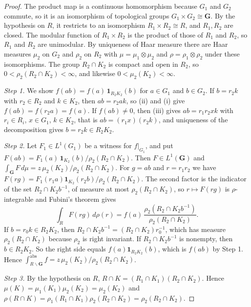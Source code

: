 \begin{proof}
The product map is a continuous homomorphism because $G_1$ and $G_2$ commute, so it is an isomorphism of topological groups $G_1\times G_2\cong\mathbf G$. By the hypothesis on $R$, it restricts to an isomorphism $R_1\times R_2\cong R$, and $R_1,R_2$ are closed. The modular function of $R_1\times R_2$ is the product of those of $R_1$ and $R_2$, so $R_1$ and $R_2$ are unimodular. By uniqueness of Haar measure there are Haar measures $\mu_2$ on $G_2$ and $\rho_2$ on $R_2$ with $\mu=\mu_1\otimes\mu_2$ and $\rho=\rho_1\otimes\rho_2$ under these isomorphisms. The group $R_2\cap K_2$ is compact and open in $R_2$, so $0<\rho_2(R_2\cap K_2)<\infty$, and likewise $0<\mu_2(K_2)<\infty$.

\emph{Step 1.} We show $f(ab)=f(a)\,\mathbf 1_{R_2K_2}(b)$ for $a\in G_1$ and $b\in G_2$. If $b=r_2k$ with $r_2\in R_2$ and $k\in K_2$, then $ab=r_2ak$, so (ii) and (i) give $f(ab)=f(r_2a)=f(a)$. If $f(ab)\ne0$, then (iii) gives $ab=r_1r_2xk$ with $r_i\in R_i$, $x\in G_1$, $k\in K_2$, that is $ab=(r_1x)(r_2k)$, and uniqueness of the decomposition gives $b=r_2k\in R_2K_2$.

\emph{Step 2.} Let $F_1\in L^1(G_1)$ be a witness for $f|_{G_1}$, and put $F(ab)=F_1(a)\,\mathbf 1_{K_2}(b)/\rho_2(R_2\cap K_2)$. Then $F\in L^1(\mathbf G)$ and $\int_{\mathbf G}F\,d\mu=z\,\mu_2(K_2)/\rho_2(R_2\cap K_2)$. For $g=ab$ and $r=r_1r_2$ we have $F(rg)=F_1(r_1a)\mathbf 1_{K_2}(r_2b)/\rho_2(R_2\cap K_2)$. The second factor is the indicator of the set $R_2\cap K_2b^{-1}$, of measure at most $\rho_2(R_2\cap K_2)$, so $r\mapsto F(rg)$ is $\rho$-integrable and Fubini's theorem gives
\[
\int_RF(rg)\,d\rho(r)=f(a)\,\frac{\rho_2(R_2\cap K_2b^{-1})}{\rho_2(R_2\cap K_2)} .
\]
If $b=r_0k\in R_2K_2$, then $R_2\cap K_2b^{-1}=(R_2\cap K_2)r_0^{-1}$, which has measure $\rho_2(R_2\cap K_2)$ because $\rho_2$ is right invariant. If $R_2\cap K_2b^{-1}$ is nonempty, then $b\in R_2K_2$. So the right side equals $f(a)\mathbf 1_{R_2K_2}(b)$, which is $f(ab)$ by Step 1. Hence $\int^{\mathrm{abs}}_{R\backslash\mathbf G}f=z\,\mu_2(K_2)/\rho_2(R_2\cap K_2)$.

\emph{Step 3.} By the hypothesis on $R$, $R\cap K=(R_1\cap K_1)(R_2\cap K_2)$. Hence $\mu(K)=\mu_1(K_1)\mu_2(K_2)=\mu_2(K_2)$ and $\rho(R\cap K)=\rho_1(R_1\cap K_1)\rho_2(R_2\cap K_2)=\rho_2(R_2\cap K_2)$.
\end{proof}


